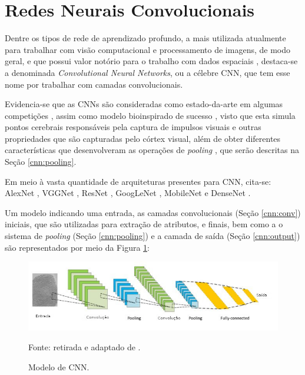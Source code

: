 \section{Redes Neurais Convolucionais}
\label{cnn}

Dentre os tipos de rede de aprendizado profundo, a mais utilizada atualmente para trabalhar com visão computacional e processamento de imagens, de modo geral, e que possui valor notório para o trabalho com dados espaciais \citep{Goodfellow2016, ponti2018funciona, Ghosh2019}, destaca-se a denominada \textit{Convolutional Neural Networks}\citep{LeCun1999}, ou a célebre CNN, que tem esse nome por trabalhar com camadas convolucionais.

Evidencia-se que as CNNs são consideradas como estado-da-arte em algumas competições \cite{Parkhi2015}, assim como modelo bioinspirado de sucesso \cite{Goodfellow2016}, visto que esta simula pontos cerebrais responsáveis pela captura de impulsos visuais e outras propriedades que são capturadas pelo córtex visual, além de obter diferentes características que desenvolveram as operações de \textit{pooling} \cite{Goodfellow2016}, que serão descritas na Seção \ref{cnn:pooling}.

Em meio à vasta quantidade de arquiteturas presentes para CNN, cita-se: AlexNet \cite{krizhevsky2012imagenet}, VGGNet \cite{Simonyan2015}, ResNet \cite{He2016}, GoogLeNet \cite{Szegedy2015}, MobileNet \cite{Howard2017} e DenseNet \cite{Huang2017}.

Um modelo indicando uma entrada, as camadas convolucionais (Seção \ref{cnn:conv}) iniciais, que são utilizadas para extração de atributos, e finais, bem como a o sistema de \textit{pooling} (Seção \ref{cnn:pooling}) e a camada de saída (Seção \ref{cnn:output}) são representados por meio da Figura \ref{cnn:fig:10}:

\begin{figure}[H]
    \centering
    \caption{Modelo de CNN.}
    \includegraphics[width=1\linewidth]{recursos/imagens/deep/cnn.jpg}
    \label{cnn:fig:10}

    Fonte: retirada e adaptado de \cite{Minaee2021DeepClassification}.
\end{figure}

